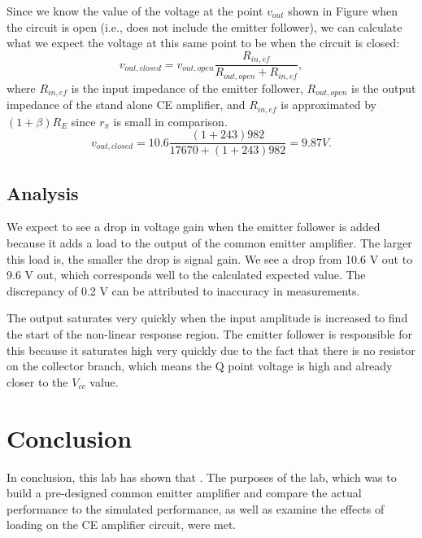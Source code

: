 \documentclass[12pt,letterpaper]{report}
\begin{document}
Since we know the value of the voltage at the point $v_{out}$ shown in Figure %
when the circuit is open (i.e., does not include the emitter follower), we can calculate what we expect the voltage at this same point to be when the circuit is closed:
$$
v_{out,closed} = v_{out,open}\frac{R_{in,ef}}{R_{out,open}+R_{in,ef}},
$$
where $R_{in,ef}$ is the input impedance of the emitter follower, $R_{out,open}$ is the output impedance of the stand alone CE amplifier, and $R_{in,ef}$ is approximated by $(1+\beta)R_E$ since $r_{\pi}$ is small in comparison.
$$
v_{out,closed} = 10.6 \frac{(1+243)982}{17670+(1+243)982} = 9.87 V.
$$


\subsection*{Analysis}

We expect to see a drop in voltage gain when the emitter follower is added because it adds a load to the output of the common emitter amplifier. The larger this load is, the smaller the drop is signal gain. We see a drop from 10.6 V out to 9.6 V out, which corresponds well to the calculated expected value. The discrepancy of 0.2 V can be attributed to inaccuracy in measurements.

The output saturates very quickly when the input amplitude is increased to find the start of the non-linear response region. The emitter follower is responsible for this because it saturates high very quickly due to the fact that there is no resistor on the collector branch, which means the Q point voltage is high and already closer to the $V_{cc}$ value.

\section*{Conclusion}

In conclusion, this lab has shown that 
. The purposes of the lab, which was to build a pre-designed common emitter amplifier and compare the actual performance to the simulated performance, as well as  examine the effects of loading on the CE amplifier circuit, were met.
\end{document}
